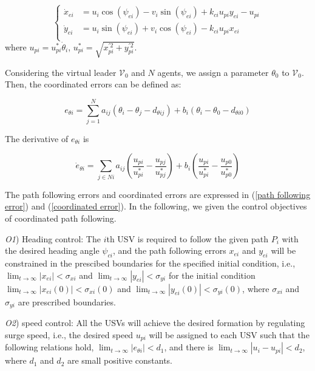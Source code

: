 \documentclass[english]{cccconf}
\begin{document}
\begin{equation}
	\left\{
	\begin{aligned}
		\dot{x}_{ei}&=u_i\cos(\psi_{ei})-v_i\sin(\psi_{ei})+k_{ci}u_{pi}y_{ei}-u_{pi}\\
		\dot{y}_{ei}&=u_i\sin(\psi_{ei})+v_i\cos(\psi_{ei})-k_{ci}u_{pi}x_{ei}\\
	\end{aligned}
	\right.
\end{equation}
where $u_{pi}=u^*_{pi}\dot{\theta}_i$, $u^*_{pi}=\sqrt{x^{'2}_{pi}+y^{'2}_{pi}}$.

Considering the virtual leader $\mathcal{V}_0$ and $N$ agents, we assign a parameter $\theta_0$ to $\mathcal{V}_0$. Then, the coordinated errors can be defined as:

\begin{equation}\label{coordinated error}
	e_{\theta i}=\sum^N_{j=1}a_{ij}(\theta_i-\theta_j-d_{\theta ij})+b_i(\theta_i-\theta_0-d_{\theta i0})
\end{equation}

The derivative of $e_{\theta i}$ is

\begin{equation}
	\dot{e}_{\theta i}=\sum_{j\in Ni}a_{ij}(\frac{u_{pi}}{u^*_{pi}}-\frac{u_{pj}}{u^*_{pj}})+b_i(\frac{u_{pi}}{u^*_{pi}}-\frac{u_{p0}}{u^*_{p0}})
\end{equation}

The path following errors and coordinated errors are expressed in (\ref{path following error}) and (\ref{coordinated error}). In the following, we given the control objectives of coordinated path following.

\emph{O1}) Heading control: The $i$th USV is required to follow the given path $P_i$ with the desired heading angle $\psi_{ci}$, and the path following errors $x_{ei}$ and $y_{ei}$ will be constrained in the prescibed boundaries for the specified initial condition, i.e., $\lim_{t\to \infty}\left|x_{ei}\right|< \sigma_{xi}$ and $\lim_{t\to \infty}\left|y_{ei}\right|< \sigma_{yi}$ for the initial condition $\lim_{t\to \infty}\left|x_{ei}(0)\right|< \sigma_{xi}(0)$ and $\lim_{t\to \infty}\left|y_{ei}(0)\right|< \sigma_{yi}(0)$, where $\sigma_{xi}$ and $\sigma_{yi}$ are prescribed boundaries.

\emph{O2}) speed control: All the USVs will achieve the desired formation by regulating surge speed, i.e., the desired speed $u_{pi}$ will be assigned to each USV such that the following relations hold, $\lim_{t\to \infty}\left|e_{\theta i}\right|<d_1$, and there is $\lim_{t\to \infty}\left|u_{i}-u_{pi}\right|<d_2$, where $d_1$ and $d_2$ are small positive constants. 
\end{document}
